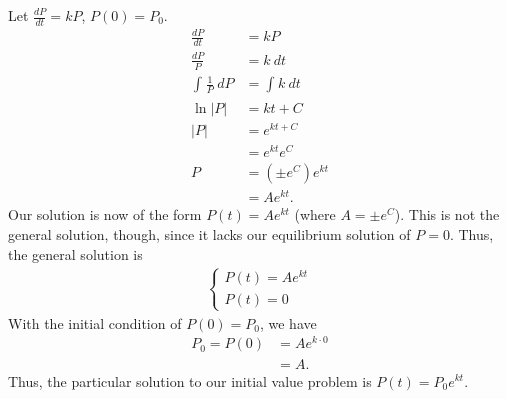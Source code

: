 \documentclass[10pt]{mypackage}
\begin{document}
\begin{example}
  Let $\frac{dP}{dt} = kP$, $P(0) = P_0$.
  \begin{align*}
    \frac{dP}{dt} &= kP\\
    \frac{dP}{P} &= k\:dt\\
    \int_{}^{} \frac{1}{P}\:dP &= \int_{}^{} k\:dt\\
    \ln|P| &= kt + C\\
    |P| &= e^{kt + C}\\
      &= e^{kt}e^{C}\\
    P &= \left(\pm e^{C}\right)e^{kt}\\
      &= Ae^{kt}.
  \end{align*}
  Our solution is now of the form $P(t) = Ae^{kt}$ (where $A = \pm e^{C}$). This is not the general solution, though, since it lacks our equilibrium solution of $P = 0$. Thus, the general solution is
  \begin{align*}
    \begin{cases}
      P(t) = Ae^{kt}\\
      P(t) = 0
    \end{cases}
  \end{align*}
  With the initial condition of $P(0) = P_0$, we have
  \begin{align*}
    P_0 = P(0)
         &= Ae^{k\cdot 0}\\
         &= A.
  \end{align*}
  Thus, the particular solution to our initial value problem is $P(t) = P_0e^{kt}$.
\end{example}
\end{document}
